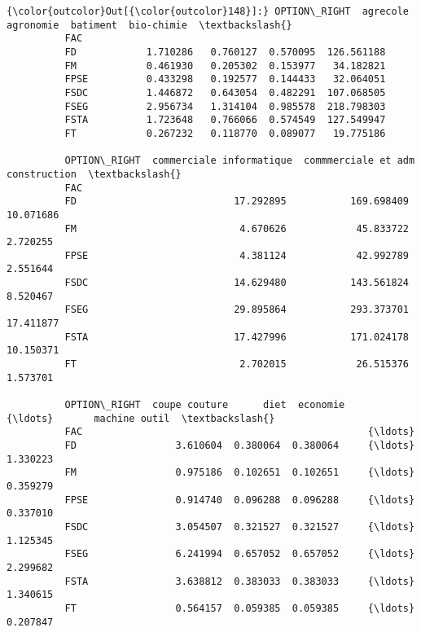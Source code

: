 \documentclass[11pt]{article}
\begin{document}
            \begin{Verbatim}[commandchars=\\\{\}]
{\color{outcolor}Out[{\color{outcolor}148}]:} OPTION\_RIGHT  agrecole  agronomie  batiment  bio-chimie  \textbackslash{}
          FAC                                                       
          FD            1.710286   0.760127  0.570095  126.561188   
          FM            0.461930   0.205302  0.153977   34.182821   
          FPSE          0.433298   0.192577  0.144433   32.064051   
          FSDC          1.446872   0.643054  0.482291  107.068505   
          FSEG          2.956734   1.314104  0.985578  218.798303   
          FSTA          1.723648   0.766066  0.574549  127.549947   
          FT            0.267232   0.118770  0.089077   19.775186   
          
          OPTION\_RIGHT  commerciale informatique  commmerciale et adm  construction  \textbackslash{}
          FAC                                                                         
          FD                           17.292895           169.698409     10.071686   
          FM                            4.670626            45.833722      2.720255   
          FPSE                          4.381124            42.992789      2.551644   
          FSDC                         14.629480           143.561824      8.520467   
          FSEG                         29.895864           293.373701     17.411877   
          FSTA                         17.427996           171.024178     10.150371   
          FT                            2.702015            26.515376      1.573701   
          
          OPTION\_RIGHT  coupe couture      diet  economie     {\ldots}       machine outil  \textbackslash{}
          FAC                                                 {\ldots}                       
          FD                 3.610604  0.380064  0.380064     {\ldots}            1.330223   
          FM                 0.975186  0.102651  0.102651     {\ldots}            0.359279   
          FPSE               0.914740  0.096288  0.096288     {\ldots}            0.337010   
          FSDC               3.054507  0.321527  0.321527     {\ldots}            1.125345   
          FSEG               6.241994  0.657052  0.657052     {\ldots}            2.299682   
          FSTA               3.638812  0.383033  0.383033     {\ldots}            1.340615   
          FT                 0.564157  0.059385  0.059385     {\ldots}            0.207847   
          

\end{Verbatim}
\end{document}
